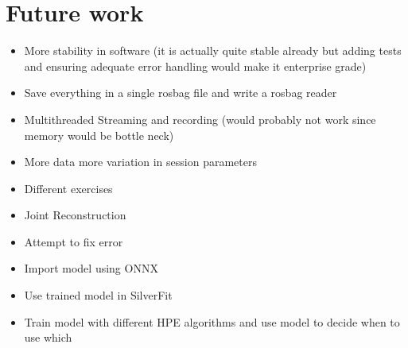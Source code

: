 \section{Future work}

\begin{itemize}
  \item More stability in software (it is actually quite stable already but adding tests and ensuring adequate error handling would make it enterprise grade)
  \item Save everything in a single rosbag file and write a rosbag reader
  \item Multithreaded Streaming and recording (would probably not work since memory would be bottle neck)
  \item More data more variation in session parameters
  \item Different exercises
  \item Joint Reconstruction
  \item Attempt to fix error
  \item Import model using ONNX 
  \item Use trained model in SilverFit
  \item Train model with different HPE algorithms and use model to decide when to use which
\end{itemize}